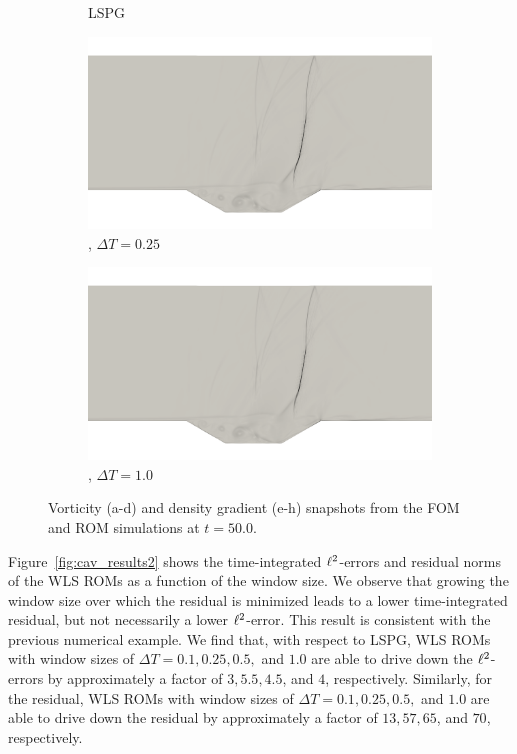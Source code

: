 \begin{figure}
\begin{center}
\begin{subfigure}[t]{0.49\textwidth}
\caption{LSPG}
\end{subfigure}
\begin{subfigure}[t]{0.49\textwidth}
\includegraphics[trim={10cm 3cm 10cm 12cm},clip,width=1.0\linewidth]{figs/cavity_new/dens_wls_numStepsInWindow_5_t50.png}
\caption{\methodAcronym, $\Delta T = 0.25$}
\end{subfigure}
\begin{subfigure}[t]{0.49\textwidth}
\includegraphics[trim={10cm 3cm 10cm 12cm},clip,width=1.0\linewidth]{figs/cavity_new/dens_wls_numStepsInWindow_20_t50.png}
\caption{\methodAcronym, $\Delta T = 1.0$}
\end{subfigure}
\caption{Vorticity (a-d) and density gradient (e-h) snapshots from the FOM and ROM simulations at $t=50.0$.} 
\label{fig:cav_snapshots}
\end{center}
\end{figure}

Figure~\ref{fig:cav_results2} shows the time-integrated $\ell^2$-errors and residual norms of the WLS ROMs as a function of the window size. We observe that growing the window size over 
which the residual is minimized leads to a lower time-integrated residual, but not necessarily a lower $\ell^2$-error. This result is consistent with the previous numerical example. We find that, with respect to LSPG, WLS ROMs with window sizes of $\Delta T = 0.1, 0.25, 0.5,$  and $1.0$ are able to drive down the $\ell^2$-errors by approximately a factor of $3, 5.5, 4.5$, and $4$, respectively. Similarly, for the residual, WLS ROMs with window sizes of $\Delta T = 0.1, 0.25, 0.5,$  and $1.0$ are able to drive down the residual by approximately a factor of $13,57,65$, and $70$, respectively. 

